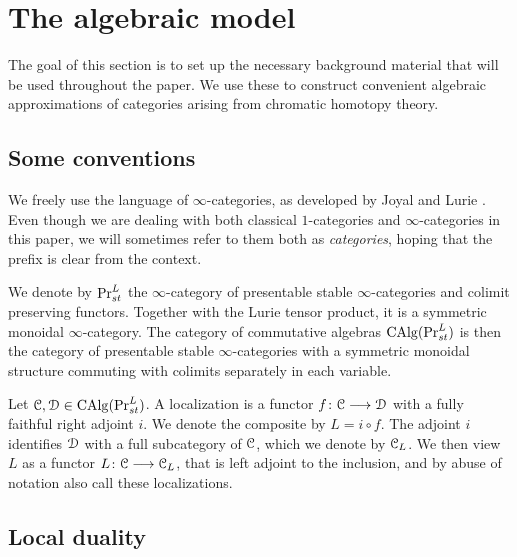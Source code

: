 
\section{The algebraic model}

The goal of this section is to set up the necessary background material that will be used throughout the paper. We use these to construct convenient algebraic approximations of categories arising from chromatic homotopy theory. 

\subsection*{Some conventions}

We freely use the language of $\infty$-categories, as developed by Joyal \cite{joyal_02} and Lurie \cite{lurie_09, Lurie_HA}. Even though we are dealing with both classical $1$-categories and $\infty$-categories in this paper, we will sometimes refer to them both as \emph{categories}, hoping that the prefix is clear from the context. 

We denote by $\mathrm{Pr}_{st}^L$ the $\infty$-category of presentable stable $\infty$-categories and colimit preserving functors. Together with the Lurie tensor product, it is a symmetric monoidal $\infty$-category. The category of commutative algebras $\operatorname{CAlg}(\mathrm{Pr}_{st}^L)$ is then the category of presentable stable $\infty$-categories with a symmetric monoidal structure commuting with colimits separately in each variable. 

Let $\EuScript{C}, \EuScript{D}\in \operatorname{CAlg}(\mathrm{Pr}_{st}^L)$. A localization is a functor $f\colon \EuScript{C}\longrightarrow \EuScript{D}$ with a fully faithful right adjoint $i$. We denote the composite by $L= i\circ f$. The adjoint $i$ identifies $\EuScript{D}$ with a full subcategory of $\EuScript{C}$, which we denote by $\EuScript{C}_L$. We then view $L$ as a functor $L\colon \EuScript{C}\longrightarrow\EuScript{C}_L$, that is left adjoint to the inclusion, and by abuse of notation also call these localizations. 



















\subsection{Local duality}

